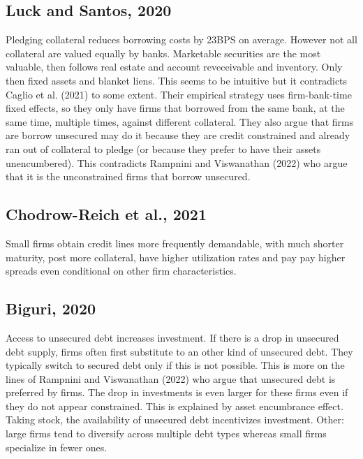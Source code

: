 \documentclass[12pt]{article}
\begin{document}
\subsection*{Luck and Santos, 2020  \checkmark}
Pledging collateral reduces borrowing costs by 23BPS on average. However not all collateral are valued equally by banks. Marketable securities are the most valuable, then follows real estate and account reveceivable and inventory. Only then fixed assets and blanket liens. This seems to be intuitive but it contradicts Caglio et al. (2021) to some extent. Their empirical strategy uses firm-bank-time fixed effects, so they only have firms that borrowed from the same bank, at the same time, multiple times, against different collateral.  They also argue that firms are borrow unsecured may do it because they are credit constrained and already ran out of collateral to pledge (or because they prefer to have their assets unencumbered). This contradicts Rampnini and Viswanathan (2022) who argue that it is the unconstrained firms that borrow unsecured. 

\subsection*{Chodrow-Reich et al., 2021}
Small firms obtain credit lines more frequently demandable, with much shorter maturity, post more collateral, have higher utilization rates and pay pay higher spreads even conditional on other firm characteristics. 

\subsection*{Biguri, 2020 \checkmark}
Access to unsecured debt increases investment. If there is a drop in unsecured debt supply, firms often first substitute to an other kind of unsecured debt. They typically switch to secured debt only if this is not possible. This is more on the lines of Rampnini and Viswanathan (2022) who argue that unsecured debt is preferred by firms. The drop in investments is even larger for these firms even if they do not appear constrained. This is explained by asset encumbrance effect. Taking stock, the availability of unsecured debt incentivizes investment. Other: large firms tend to diversify  across multiple debt types whereas small firms specialize in fewer ones. 
\end{document}
